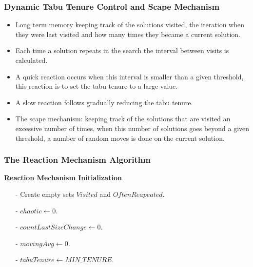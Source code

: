 \documentclass{beamer}
\begin{document}
\begin{frame}
  \frametitle{Dynamic Tabu Tenure Control and Scape Mechanism}
{
	
\begin{itemize}
	\item<1-> Long term memory keeping track of the solutions visited, the iteration when they were last visited and how many times they became a current solution.
	\item<2-> Each time a solution repeats in the search the interval between visits is calculated.
	\item<3-> A quick reaction occurs when this interval is smaller than a given threshold, this reaction is to set the tabu tenure to a large value.
	\item<4-> A slow reaction follows gradually reducing the tabu tenure. 
	\item<5-> The scape mechanism: keeping track of the solutions that are visited an excessive number of times, when this number of solutions goes beyond a given threshold, a number of random moves is done on the current solution.
	
\end{itemize}
}
\end{frame}


\begin{frame}
  \frametitle{The Reaction Mechanism Algorithm}
{
	
{\bf Reaction Mechanism Initialization}
\begin{itemize}
    \item[-] Create empty sets $Visited$ and $OftenReapeated$.
    \item[-] $chaotic \leftarrow 0$.
    \item[-] $countLastSizeChange \leftarrow 0$.
    \item[-] $movingAvg\leftarrow 0$.
    \item[-] $tabuTenure \leftarrow MIN\_TENURE$.
\end{itemize}
}
\end{frame}
\end{document}
